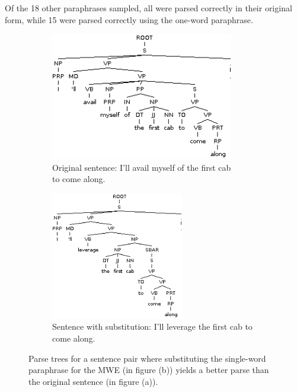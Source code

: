 \documentclass[11pt]{article}
\begin{document}
Of the 18 other paraphrases sampled, all were parsed correctly in their original form, while 15 were parsed correctly using the one-word paraphrase. 

\begin{figure}
\centering
\begin{subfigure}{.5\textwidth}
  \centering
  \includegraphics[width=80mm]{figs/avail_myself_of_tree.png}
  \caption{Original sentence: I'll avail myself of the first cab \\ to come along.}
  \label{fig:sub1}
\end{subfigure}%
\begin{subfigure}{.5\textwidth}
  \centering
  \includegraphics[width=58mm]{figs/leverage_tree.png}
  \caption{Sentence with substitution: I'll leverage the first cab to come along.}
  \label{fig:sub2}
\end{subfigure}
\caption{Parse trees for a sentence pair where substituting the single-word paraphrase for the MWE (in figure (b)) yields a better parse than the original sentence (in figure (a)).}
\label{avail}
\end{figure}
\end{document}
